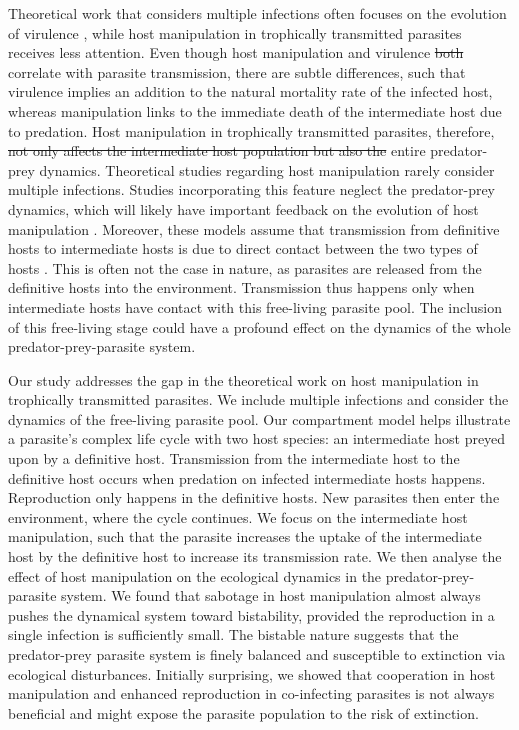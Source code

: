 \documentclass[a4paper]{scrartcl}
\providecommand{\DIFaddtex}[1]{{\protect\color{blue}\uwave{#1}}} %
\providecommand{\DIFdeltex}[1]{{\protect\color{red}\sout{#1}}}                      %
\providecommand{\DIFaddbegin}{} %
\providecommand{\DIFaddend}{} %
\providecommand{\DIFdelbegin}{} %
\providecommand{\DIFdelend}{} %
\providecommand{\DIFadd}[1]{\texorpdfstring{\DIFaddtex{#1}}{#1}} %
\providecommand{\DIFdel}[1]{\texorpdfstring{\DIFdeltex{#1}}{}} %
\newcommand{\DIFscaledelfig}{0.5}
\newlength{\DIFdelgraphicswidth} %
\newlength{\DIFdelgraphicsheight} %
\newcommand{\DIFaddincludegraphics}[2][]{{\color{blue}\fbox{\DIFOincludegraphics[#1]{#2}}}} %
\newcommand{\DIFdelincludegraphics}[2][]{%
\sbox{\DIFdelgraphicsbox}{\DIFOincludegraphics[#1]{#2}}%
\settoboxwidth{\DIFdelgraphicswidth}{\DIFdelgraphicsbox} %
\settoboxtotalheight{\DIFdelgraphicsheight}{\DIFdelgraphicsbox} %
\scalebox{\DIFscaledelfig}{%
\parbox[b]{\DIFdelgraphicswidth}{\usebox{\DIFdelgraphicsbox}\\[-\baselineskip] \rule{\DIFdelgraphicswidth}{0em}}\llap{\resizebox{\DIFdelgraphicswidth}{\DIFdelgraphicsheight}{%
\setlength{\unitlength}{\DIFdelgraphicswidth}%
\begin{picture}(1,1)%
\thicklines\linethickness{2pt} %
{\color[rgb]{1,0,0}\put(0,0){\framebox(1,1){}}}%
{\color[rgb]{1,0,0}\put(0,0){\line( 1,1){1}}}%
{\color[rgb]{1,0,0}\put(0,1){\line(1,-1){1}}}%
\end{picture}%
}\hspace*{3pt}}} %
} %
\DeclareRobustCommand{\DIFaddbegin}{\DIFOaddbegin \let\includegraphics\DIFaddincludegraphics} %
\DeclareRobustCommand{\DIFaddend}{\DIFOaddend \let\includegraphics\DIFOincludegraphics} %
\DeclareRobustCommand{\DIFdelbegin}{\DIFOdelbegin \let\includegraphics\DIFdelincludegraphics} %
\DeclareRobustCommand{\DIFdelend}{\DIFOaddend \let\includegraphics\DIFOincludegraphics} %
\begin{document}
Theoretical work that considers multiple infections often focuses on the evolution of virulence \citep{vanBaalen1995, Alizon2013, Alizon2008, Choisy2010, Alizon2012}, while host manipulation in trophically transmitted parasites receives less attention. 
Even though host manipulation and virulence \DIFdelbegin \DIFdel{both }\DIFdelend correlate with parasite transmission, there are subtle differences, such that virulence implies an addition to the natural mortality rate of the infected host, whereas manipulation links to the immediate death of the intermediate host due to predation. 
Host manipulation in trophically transmitted parasites, therefore, \DIFdelbegin \DIFdel{not only affects the intermediate host population but also the }\DIFdelend \DIFaddbegin \DIFadd{strongly affects the }\DIFaddend entire predator-prey dynamics. 
Theoretical studies regarding host manipulation rarely consider multiple infections. 
Studies incorporating this feature neglect the predator-prey dynamics, which will likely have important feedback on the evolution of host manipulation \citep{Parker2003,Vickery2009}.
Moreover, these models assume that transmission from definitive hosts to intermediate hosts is due to direct contact between the two types of hosts \citep{Rogawa2018, Hadeler1989, Fenton2006}. 
This is often not the case in nature, as parasites are released from the definitive hosts into the environment. 
Transmission thus happens only when intermediate hosts have contact with this free-living parasite pool. The inclusion of this free-living stage could have a profound effect on the dynamics of the whole predator-prey-parasite system.


Our study addresses the gap in the theoretical work on host manipulation in trophically transmitted parasites.
We include multiple infections and consider the dynamics of the free-living parasite pool. 
Our compartment model helps illustrate a parasite's complex life cycle with two host species: an intermediate host preyed upon by a definitive host. 
Transmission from the intermediate host to the definitive host occurs when predation on infected intermediate hosts happens. 
Reproduction only happens in the definitive hosts. 
New parasites then enter the environment, where the cycle continues. 
We focus on the intermediate host manipulation, such that the parasite increases the uptake of the intermediate host by the definitive host to increase its transmission rate. 
We then analyse the effect of host manipulation on the ecological dynamics in the predator-prey-parasite system. 
We found that sabotage in host manipulation almost always pushes the dynamical system toward bistability, provided the reproduction in a single infection is sufficiently small. 
The bistable nature suggests that the predator-prey parasite system is finely balanced and susceptible to extinction via ecological disturbances. 
Initially surprising, we showed that cooperation in host manipulation and enhanced reproduction in co-infecting parasites is not always beneficial and might expose the parasite population to the risk of extinction.
\end{document}
